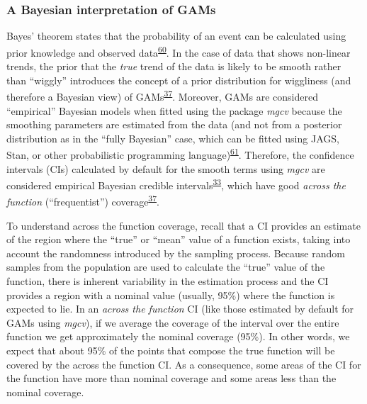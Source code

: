 \documentclass[
]{article}
\begin{document}
\hypertarget{a-bayesian-interpretation-of-gams}{%
\subsubsection{A Bayesian interpretation of GAMs}\label{a-bayesian-interpretation-of-gams}}

Bayes' theorem states that the probability of an event can be calculated using prior knowledge and observed data\textsuperscript{\protect\hyperlink{ref-mcelreath2018}{60}}. In the case of data that shows non-linear trends, the prior that the \emph{true} trend of the data is likely to be smooth rather than ``wiggly'' introduces the concept of a prior distribution for wiggliness (and therefore a Bayesian view) of GAMs\textsuperscript{\protect\hyperlink{ref-wood2017}{37}}. Moreover, GAMs are considered ``empirical'' Bayesian models when fitted using the package \emph{mgcv} because the smoothing parameters are estimated from the data (and not from a posterior distribution as in the ``fully Bayesian'' case, which can be fitted using JAGS, Stan, or other probabilistic programming language)\textsuperscript{\protect\hyperlink{ref-miller2019}{61}}. Therefore, the confidence intervals (CIs) calculated by default for the smooth terms using \emph{mgcv} are considered empirical Bayesian credible intervals\textsuperscript{\protect\hyperlink{ref-pedersen2019}{33}}, which have good \emph{across the function} (``frequentist'') coverage\textsuperscript{\protect\hyperlink{ref-wood2017}{37}}.

To understand across the function coverage, recall that a CI provides an estimate of the region where the ``true'' or ``mean'' value of a function exists, taking into account the randomness introduced by the sampling process. Because random samples from the population are used to calculate the ``true'' value of the function, there is inherent variability in the estimation process and the CI provides a region with a nominal value (usually, 95\%) where the function is expected to lie. In an \emph{across the function} CI (like those estimated by default for GAMs using \emph{mgcv}), if we average the coverage of the interval over the entire function we get approximately the nominal coverage (95\%). In other words, we expect that about 95\% of the points that compose the true function will be covered by the across the function CI. As a consequence, some areas of the CI for the function have more than nominal coverage and some areas less than the nominal coverage.
\end{document}
